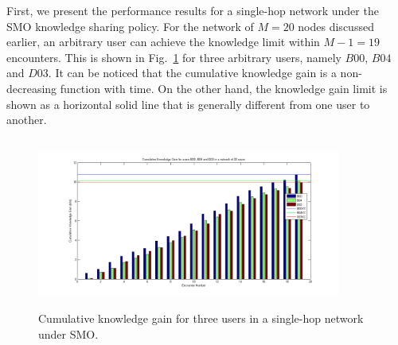 \documentclass[12pt,epsf]{article}
\theoremstyle{definition}
\begin{document}
First, we present the performance results for a single-hop network under the SMO knowledge sharing policy. For the network of $M=20$ nodes discussed earlier, an 
arbitrary user can achieve the knowledge limit within $M-1=19$ encounters. This is shown in Fig.~\ref{fig:B00_SSHOP)} for three arbitrary users, namely $B00$, $B04$ and $D03$. It can be noticed that the cumulative knowledge gain is a non-decreasing function with time. On the other hand, the knowledge gain limit is shown as 
a horizontal solid line that is generally different from one user to another.
%
\begin{figure}[!tp]
\centering
    \includegraphics[width=10cm ,height=5.6cm]{figures_png/Fig5}
    \caption{Cumulative knowledge gain for three users in a single-hop network under SMO.}\label{fig:B00_SSHOP)}
\end{figure}
%
\end{document}
